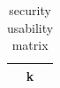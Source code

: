 \begin{table}[h]
\centering
\begin{tabular}{|c|}
\hline
k \\ \hline
\hline
\end{tabular}
\caption{security usability matrix}
\label{tab:T14}
\end{table}
